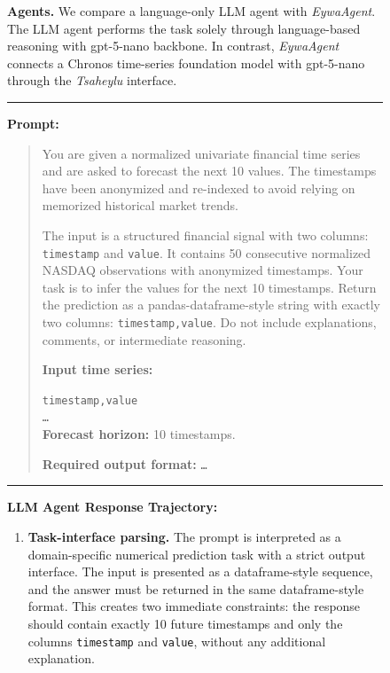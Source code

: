 \documentclass{llmxive}
\begin{document}
{\begin{figure}[!htbp]
{\begin{tcolorbox}[colback=gray!5!white, colframe=red!60, 
title=Case Study A.1: How LLM Agent Fails a Domain-Specific Problem, boxrule=0.3mm, width=1.2\textwidth, arc=2mm, auto outer arc=true]
\vspace{3mm}
\textbf{Agents.}
We compare a language-only LLM agent with \textit{EywaAgent}. The LLM agent performs the task solely through language-based reasoning with gpt-5-nano backbone. In contrast, \textit{EywaAgent} connects a Chronos time-series foundation model with gpt-5-nano through the \textit{Tsaheylu} interface.

\vspace{3mm}
\hrule 
\vspace{3mm}
\textbf{Prompt:} 
\begin{quote}
You are given a normalized univariate financial time series and are asked to forecast the next 10 values. The timestamps have been anonymized and re-indexed to avoid relying on memorized historical market trends.

The input is a structured financial signal with two columns: \texttt{timestamp} and \texttt{value}. It contains 50 consecutive normalized NASDAQ observations with anonymized timestamps. Your task is to infer the values for the next 10 timestamps.
Return the prediction as a pandas-dataframe-style string with exactly two columns: \texttt{timestamp,value}. Do not include explanations, comments, or intermediate reasoning.

\textbf{Input time series:}

\texttt{timestamp,value}\\
\texttt{\ldots}\\

\textbf{Forecast horizon:} 10 timestamps.

\textbf{Required output format:} \texttt{\ldots}\\

\end{quote}

\hrule
\vspace{3mm}

\textbf{LLM Agent Response Trajectory:}

\begin{enumerate}
    \item \textbf{Task-interface parsing.}
    The prompt is interpreted as a domain-specific numerical prediction task with a strict output interface. The input is presented as a dataframe-style sequence, and the answer must be returned in the same dataframe-style format. This creates two immediate constraints: the response should contain exactly 10 future timestamps and only the columns \texttt{timestamp} and \texttt{value}, without any additional explanation.


\end{enumerate}
\end{tcolorbox}}
\end{figure}}
\end{document}
